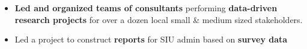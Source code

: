 \documentclass[8pt,a4paper,ragged2e,withhyper]{altacv}
\begin{document}
\begin{paracol}{2}

\begin{itemize}
    \item \textbf{Led and organized teams of consultants} performing \textbf{data-driven research projects} for over a dozen local small \& medium sized stakeholders.
    \item Led a project to construct \textbf{reports} for SIU admin based on \textbf{survey data}
\end{itemize}

\divider



    








\end{paracol}
\end{document}
